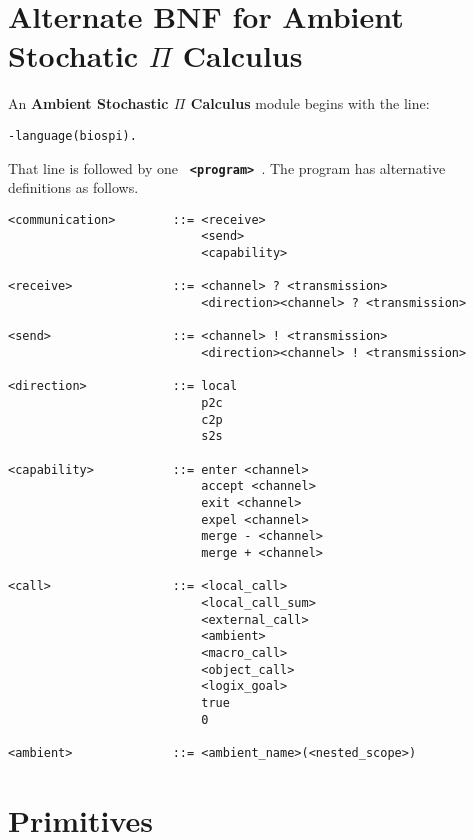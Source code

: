 \documentclass[twoside,10pt]{report}
\begin{document}
\newpage
\section{Alternate BNF for Ambient Stochatic $\Pi$ Calculus}
\label{ASPICBNF}
An {\bf Ambient Stochastic $\Pi$ Calculus} module begins with the line:

\begin{verbatim}
-language(biospi).
\end{verbatim}

\noindent
That line is followed by one {\bf \verb+ <program> +}.  The program
has alternative definitions as follows.

\begin{verbatim}
<communication>        ::= <receive>
                           <send>
                           <capability>

<receive>              ::= <channel> ? <transmission>
                           <direction><channel> ? <transmission>

<send>                 ::= <channel> ! <transmission>
                           <direction><channel> ! <transmission>

<direction>            ::= local
                           p2c
                           c2p
                           s2s

<capability>           ::= enter <channel>
                           accept <channel>
                           exit <channel>
                           expel <channel>
                           merge - <channel>
                           merge + <channel>

<call>                 ::= <local_call>
                           <local_call_sum>
                           <external_call>
                           <ambient>
                           <macro_call>
                           <object_call>
                           <logix_goal>
                           true
                           0

<ambient>              ::= <ambient_name>(<nested_scope>)
\end{verbatim}

\section{Primitives}
\end{document}

